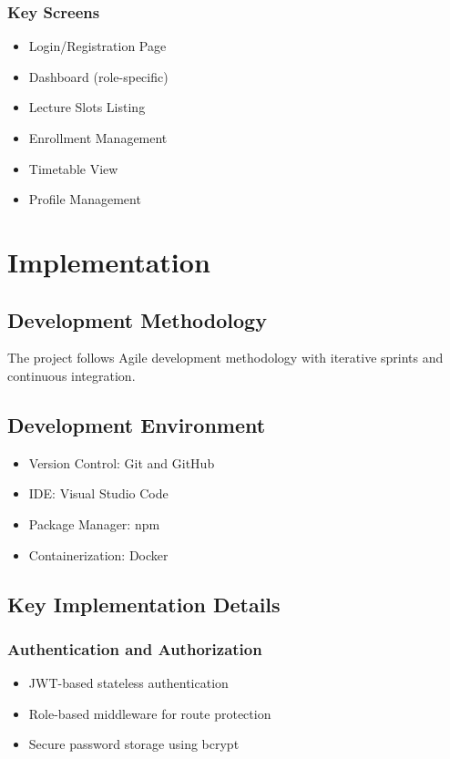 \documentclass[12pt,a4paper]{report}
\begin{document}
\subsection{Key Screens}
\begin{itemize}[leftmargin=*]
    \item Login/Registration Page
    \item Dashboard (role-specific)
    \item Lecture Slots Listing
    \item Enrollment Management
    \item Timetable View
    \item Profile Management
\end{itemize}

\chapter{Implementation}

\section{Development Methodology}
The project follows Agile development methodology with iterative sprints and continuous integration.

\section{Development Environment}
\begin{itemize}[leftmargin=*]
    \item Version Control: Git and GitHub
    \item IDE: Visual Studio Code
    \item Package Manager: npm
    \item Containerization: Docker
\end{itemize}

\section{Key Implementation Details}

\subsection{Authentication and Authorization}
\begin{itemize}[leftmargin=*]
    \item JWT-based stateless authentication
    \item Role-based middleware for route protection
    \item Secure password storage using bcrypt
\end{itemize}
\end{document}
